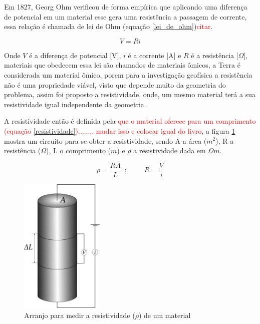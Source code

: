     Em 1827, Georg Ohm verificou de forma empírica que aplicando uma diferença de potencial em um material esse gera uma resistência a passagem de corrente, essa relação é chamada de lei de Ohm (equação \ref{lei_de_ohm})\textcolor{red}{citar}.
    
    \begin{equation}
     \label{lei_de_ohm}
     V = R i
    \end{equation}
    
    Onde $V$ é a diferença de potencial [V], $i$ é a corrente [A] e $R$ é a resistência [$\Omega$], materiais que obedecem essa lei são chamados de materiais ômicos, a Terra é considerada um material ômico, porem para a investigação geofísica a resistência não é uma propriedade viável, visto  que depende muito da geometria do problema, assim foi proposto a resistividade, onde, um mesmo material terá a sua resistividade igual independente da geometria.
    
    A resistividade então é definida pela \textcolor{red}{ que o material oferece para um comprimento (equação \ref{resistividade})........ mudar isso e colocar igual do livro}, a figura \ref{fig_resistividade} mostra um circuito para se obter a resistividade, sendo A a área ($m^2$), R a resistência ($\Omega$), L o comprimento ($m$) e $\rho$ a resistividade dada em $\Omega m$. 
    
    \begin{equation}
        \label{resistividade}
        \rho = \dfrac{R A}{L}\, \, \, ;\, \, \, \, \, \, \, \, \, \, \, \, \, \,  R = \dfrac{V}{i}
    \end{equation}
    
    
    \begin{figure}[h]
        \centering
        \caption{Arranjo para medir a resistividade ($\rho$) de um material}
        \centerline{\includegraphics[width=4cm]{texto/fig/resisti_telford.png}}
        \label{fig_resistividade}
    \end{figure}
    
